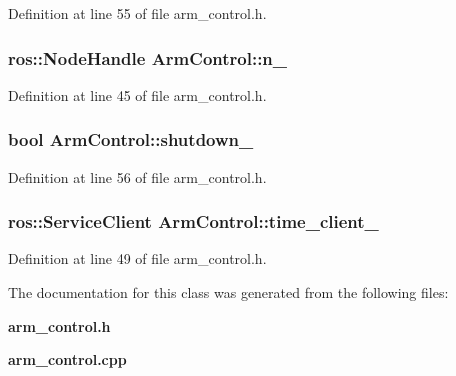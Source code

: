 \-Definition at line 55 of file arm\-\_\-control.\-h.

\subsubsection[{n\-\_\-}]{\setlength{\rightskip}{0pt plus 5cm}ros\-::\-Node\-Handle {\bf \-Arm\-Control\-::n\-\_\-}\hspace{0.3cm}{\ttfamily  [private]}}\label{classArmControl_ac7aac224c9d677c0ae7fe94de9d8f5ce}


\-Definition at line 45 of file arm\-\_\-control.\-h.

\subsubsection[{shutdown\-\_\-}]{\setlength{\rightskip}{0pt plus 5cm}bool {\bf \-Arm\-Control\-::shutdown\-\_\-}\hspace{0.3cm}{\ttfamily  [private]}}\label{classArmControl_ad5509d7953165026c865c1cb64785ab3}


\-Definition at line 56 of file arm\-\_\-control.\-h.

\subsubsection[{time\-\_\-client\-\_\-}]{\setlength{\rightskip}{0pt plus 5cm}ros\-::\-Service\-Client {\bf \-Arm\-Control\-::time\-\_\-client\-\_\-}\hspace{0.3cm}{\ttfamily  [private]}}\label{classArmControl_aa2dabe49a9e661441d6a641e4aec94e9}


\-Definition at line 49 of file arm\-\_\-control.\-h.



\-The documentation for this class was generated from the following files\-:\begin{DoxyCompactItemize}
\item 
{\bf arm\-\_\-control.\-h}\item 
{\bf arm\-\_\-control.\-cpp}\end{DoxyCompactItemize}
